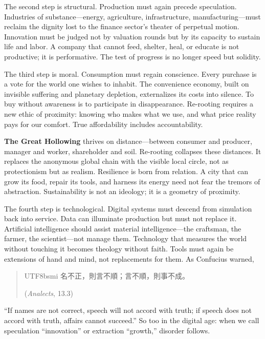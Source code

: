 \documentclass[11pt,twoside]{book}
\begin{document}
The second step is structural.  
Production must again precede speculation.  
Industries of substance—energy, agriculture, infrastructure, manufacturing—must reclaim the dignity lost to the finance sector’s theater of perpetual motion.  
Innovation must be judged not by valuation rounds but by its capacity to sustain life and labor.  
A company that cannot feed, shelter, heal, or educate is not productive; it is performative.  
The test of progress is no longer speed but solidity.

The third step is moral.  
Consumption must regain conscience.  
Every purchase is a vote for the world one wishes to inhabit.  
The convenience economy, built on invisible suffering and planetary depletion, externalizes its costs into silence.  
To buy without awareness is to participate in disappearance.  
Re-rooting requires a new ethic of proximity: knowing who makes what we use, and what price reality pays for our comfort.  
True affordability includes accountability.

\textbf{The Great Hollowing} thrives on distance—between consumer and producer, manager and worker, shareholder and soil.  
Re-rooting collapses these distances.  
It replaces the anonymous global chain with the visible local circle, not as protectionism but as realism.  
Resilience is born from relation.  
A city that can grow its food, repair its tools, and harness its energy need not fear the tremors of abstraction.  
Sustainability is not an ideology; it is a geometry of proximity.

The fourth step is technological.  
Digital systems must descend from simulation back into service.  
Data can illuminate production but must not replace it.  
Artificial intelligence should assist material intelligence—the craftsman, the farmer, the scientist—not manage them.  
Technology that measures the world without touching it becomes theology without faith.  
Tools must again be extensions of hand and mind, not replacements for them.  
As Confucius warned,
\begin{quote}
\begin{CJK*}{UTF8}{bsmi}
名不正，則言不順；言不順，則事不成。
\end{CJK*}  
(\textit{Analects}, 13.3)
\end{quote}
“If names are not correct, speech will not accord with truth; if speech does not accord with truth, affairs cannot succeed.”  
So too in the digital age: when we call speculation “innovation” or extraction “growth,” disorder follows.
\end{document}
